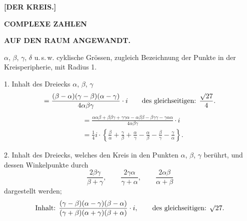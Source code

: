 \clearpage{}
\begin{center}
\textbf{[DER KREIS.]}\par\medskip
[I.]\par\medskip
\textbf{COMPLEXE ZAHLEN}\par
\textbf{AUF DEN RAUM ANGEWANDT.}
\end{center}

$\alpha$, $\beta$, $\gamma$, $\delta$ u.\,s.\,w. cyklische Grössen, zugleich Bezeichnung der Punkte in der Kreisperipherie, mit Radius 1.

1. Inhalt des Dreiecks $\alpha$, $\beta$, $\gamma$
\[
=\frac{(\beta-\alpha)(\gamma-\beta)(\alpha-\gamma)}{4\alpha\beta\gamma}\cdot i
\qquad \text{des gleichseitigen: }\frac{\mathord{\surd}27}{4}.
\]
\[
\begin{aligned}
&=\frac{\alpha\alpha\beta+\beta\beta\gamma+\gamma\gamma\alpha-\alpha\beta\beta-\beta\gamma\gamma-\gamma\alpha\alpha}{4\alpha\beta\gamma}\cdot i\\
&=\tfrac{1}{4}i\cdot\left\{\frac{\beta}{\alpha}+\frac{\gamma}{\beta}+\frac{\alpha}{\gamma}-\frac{\alpha}{\beta}-\frac{\beta}{\gamma}-\frac{\gamma}{\alpha}\right\}.
\end{aligned}
\]

2. Inhalt des Dreiecks, welches den Kreis in den Punkten $\alpha$, $\beta$, $\gamma$ berührt, und dessen Winkelpunkte durch
\[
\frac{2\beta\gamma}{\beta+\gamma},\qquad \frac{2\gamma\alpha}{\gamma+\alpha},\qquad \frac{2\alpha\beta}{\alpha+\beta}
\]
dargestellt werden;
\[
\text{Inhalt: }\frac{(\gamma-\beta)(\alpha-\gamma)(\beta-\alpha)}{(\gamma+\beta)(\alpha+\gamma)(\beta+\alpha)}\cdot i,
\qquad\text{des gleichseitigen: }\mathord{\surd}27.
\]
